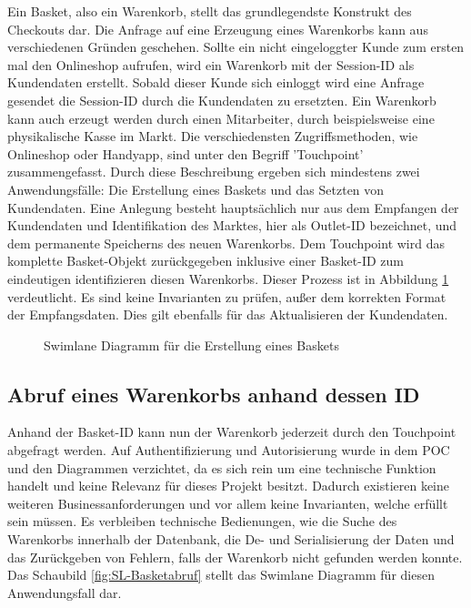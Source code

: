 Ein Basket, also ein Warenkorb, stellt das grundlegendste Konstrukt des Checkouts dar. Die Anfrage auf eine Erzeugung eines Warenkorbs kann aus verschiedenen Gründen geschehen. Sollte ein nicht eingeloggter Kunde zum ersten mal den Onlineshop aufrufen, wird ein Warenkorb mit der Session-ID als Kundendaten erstellt. Sobald dieser Kunde sich einloggt wird eine Anfrage gesendet die Session-ID durch die Kundendaten zu ersetzten. Ein Warenkorb kann auch erzeugt werden durch einen Mitarbeiter, durch beispielsweise eine physikalische Kasse im Markt. Die verschiedensten Zugriffsmethoden, wie Onlineshop oder Handyapp, sind unter den Begriff 'Touchpoint' zusammengefasst. Durch diese Beschreibung ergeben sich mindestens zwei Anwendungsfälle: Die Erstellung eines Baskets und das Setzten von Kundendaten. Eine Anlegung besteht hauptsächlich nur aus dem Empfangen der Kundendaten und Identifikation des Marktes, hier als Outlet-ID bezeichnet, und dem permanente Speicherns des neuen Warenkorbs. Dem Touchpoint wird das komplette Basket-Objekt zurückgegeben inklusive einer Basket-ID zum eindeutigen identifizieren diesen Warenkorbs. Dieser Prozess ist in Abbildung \ref{fig:SL-Basketcreation} verdeutlicht. Es sind keine Invarianten zu prüfen, außer dem korrekten Format der Empfangsdaten. Dies gilt ebenfalls für das Aktualisieren der Kundendaten.

\begin{figure}[htbp]
	\centering
	
	\caption{Swimlane Diagramm für die Erstellung eines Baskets}
	\label{fig:SL-Basketcreation}
\end{figure}

\subsection{Abruf eines Warenkorbs anhand dessen ID}

Anhand der Basket-ID kann nun der Warenkorb jederzeit durch den Touchpoint abgefragt werden. Auf Authentifizierung und Autorisierung wurde in dem POC und den Diagrammen verzichtet, da es sich rein um eine technische Funktion handelt und keine Relevanz für dieses Projekt besitzt. Dadurch existieren keine weiteren Businessanforderungen und vor allem keine Invarianten, welche erfüllt sein müssen. Es verbleiben technische Bedienungen, wie die Suche des Warenkorbs innerhalb der Datenbank, die De- und Serialisierung der Daten und das Zurückgeben von Fehlern, falls der Warenkorb nicht gefunden werden konnte. Das Schaubild \ref{fig:SL-Basketabruf} stellt das Swimlane Diagramm für diesen Anwendungsfall dar.

